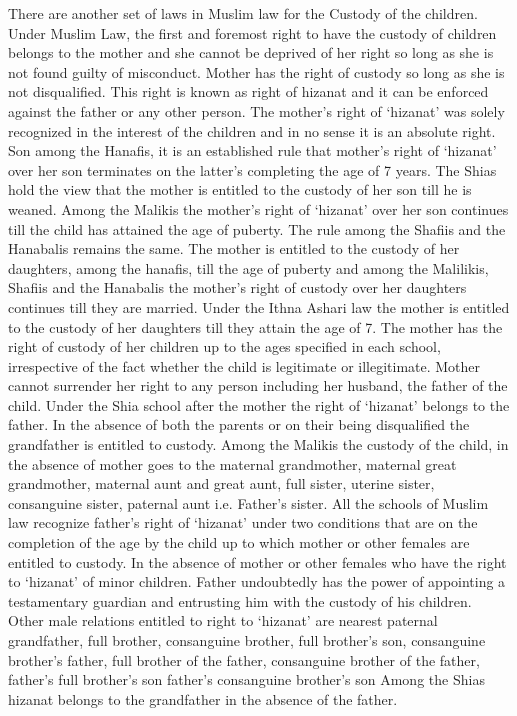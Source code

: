 \begin{multicols}{2}
\noi
There are another set of laws in Muslim law for the Custody of the children. Under Muslim Law,
the first and foremost right to have the custody of children belongs to the mother and she cannot
be deprived of her right so long as she is not found guilty of misconduct. Mother has the right of
custody so long as she is not disqualified. This right is known as right of hizanat and it can be
enforced against the father or any other person. The mother's right of ‘hizanat’ was solely
recognized in the interest of the children and in no sense it is an absolute right. Son among the
Hanafis, it is an established rule that mother's right of ‘hizanat’ over her son terminates on the
latter's completing the age of 7 years. The Shias hold the view that the mother is entitled to the 
custody of her son till he is weaned. Among the Malikis the mother's right of ‘hizanat’ over her
son continues till the child has attained the age of puberty. The rule among the Shafiis and the
Hanabalis remains the same. The mother is entitled to the custody of her daughters, among the
hanafis, till the age of puberty and among the Malilikis, Shafiis and the Hanabalis the mother's
right of custody over her daughters continues till they are married. Under the Ithna Ashari law the
mother is entitled to the custody of her daughters till they attain the age of 7. The mother has the
right of custody of her children up to the ages specified in each school, irrespective of the fact
whether the child is legitimate or illegitimate. Mother cannot surrender her right to any person
including her husband, the father of the child. Under the Shia school after the mother the right of
‘hizanat’ belongs to the father. In the absence of both the parents or on their being disqualified
the grandfather is entitled to custody. Among the Malikis the custody of the child, in the absence
of mother goes to the maternal grandmother, maternal great grandmother, maternal aunt and great
aunt, full sister, uterine sister, consanguine sister, paternal aunt i.e. Father's sister. All the schools
of Muslim law recognize father's right of ‘hizanat’ under two conditions that are on the
completion of the age by the child up to which mother or other females are entitled to custody. In
the absence of mother or other females who have the right to ‘hizanat’ of minor children. Father
undoubtedly has the power of appointing a testamentary guardian and entrusting him with the
custody of his children. Other male relations entitled to right to ‘hizanat’ are nearest paternal
grandfather, full brother, consanguine brother, full brother's son, consanguine brother's father, full
brother of the father, consanguine brother of the father, father's full brother's son father's
consanguine brother's son Among the Shias hizanat belongs to the grandfather in the absence of
the father.


\end{multicols}
